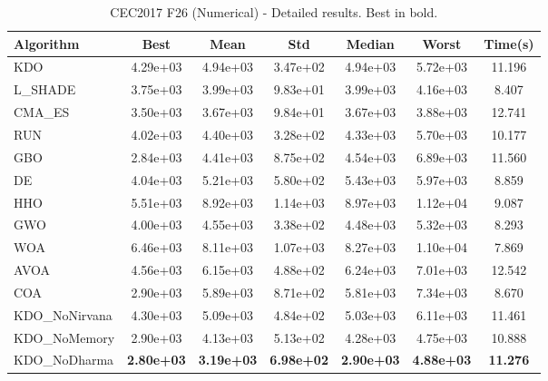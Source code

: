 \begin{table}[H]
\centering\small
\caption{CEC2017 F26 (Numerical) - Detailed results. Best in bold.}
\label{tab:cec2017_F26}
\begin{tabular}{lcccccc}
\toprule
\textbf{Algorithm} & \textbf{Best} & \textbf{Mean} & \textbf{Std} & \textbf{Median} & \textbf{Worst} & \textbf{Time(s)} \\
\midrule
KDO & 4.29e+03 & 4.94e+03 & 3.47e+02 & 4.94e+03 & 5.72e+03 & 11.196 \\
L_SHADE & 3.75e+03 & 3.99e+03 & 9.83e+01 & 3.99e+03 & 4.16e+03 & 8.407 \\
CMA_ES & 3.50e+03 & 3.67e+03 & 9.84e+01 & 3.67e+03 & 3.88e+03 & 12.741 \\
RUN & 4.02e+03 & 4.40e+03 & 3.28e+02 & 4.33e+03 & 5.70e+03 & 10.177 \\
GBO & 2.84e+03 & 4.41e+03 & 8.75e+02 & 4.54e+03 & 6.89e+03 & 11.560 \\
DE & 4.04e+03 & 5.21e+03 & 5.80e+02 & 5.43e+03 & 5.97e+03 & 8.859 \\
HHO & 5.51e+03 & 8.92e+03 & 1.14e+03 & 8.97e+03 & 1.12e+04 & 9.087 \\
GWO & 4.00e+03 & 4.55e+03 & 3.38e+02 & 4.48e+03 & 5.32e+03 & 8.293 \\
WOA & 6.46e+03 & 8.11e+03 & 1.07e+03 & 8.27e+03 & 1.10e+04 & 7.869 \\
AVOA & 4.56e+03 & 6.15e+03 & 4.88e+02 & 6.24e+03 & 7.01e+03 & 12.542 \\
COA & 2.90e+03 & 5.89e+03 & 8.71e+02 & 5.81e+03 & 7.34e+03 & 8.670 \\
KDO_NoNirvana & 4.30e+03 & 5.09e+03 & 4.84e+02 & 5.03e+03 & 6.11e+03 & 11.461 \\
KDO_NoMemory & 2.90e+03 & 4.13e+03 & 5.13e+02 & 4.28e+03 & 4.75e+03 & 10.888 \\
KDO_NoDharma & \textbf{2.80e+03} & \textbf{3.19e+03} & \textbf{6.98e+02} & \textbf{2.90e+03} & \textbf{4.88e+03} & \textbf{11.276} \\
\bottomrule
\end{tabular}
\end{table}
